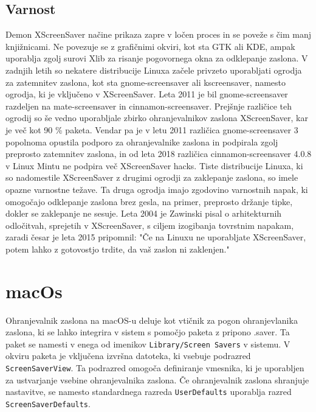 \documentclass[11pt, oneside]{article}   	%
\begin{document}
\subsection{Varnost}
Demon XScreenSaver načine prikaza zapre v ločen proces in se poveže s čim manj knjižnicami. Ne povezuje se z grafičnimi okviri, kot sta GTK ali KDE, ampak uporablja zgolj surovi Xlib za risanje pogovornega okna za odklepanje zaslona.
\newline
V zadnjih letih so nekatere distribucije Linuxa začele privzeto uporabljati ogrodja za zatemnitev zaslona, kot sta gnome-screensaver ali kscreensaver, namesto ogrodja, ki je vključeno v XScreenSaver. Leta 2011 je bil gnome-screensaver razdeljen na mate-screensaver in cinnamon-screensaver. Prejšnje različice teh ogrodij so še vedno uporabljale zbirko ohranjevalnikov zaslona XScreenSaver, kar je več kot 90 \% paketa. Vendar pa je v letu 2011 različica gnome-screensaver 3 popolnoma opustila podporo za ohranjevalnike zaslona in podpirala zgolj preprosto zatemnitev zaslona, in od leta 2018 različica cinnamon-screensaver 4.0.8 v Linux Mintu ne podpira več XScreenSaver hacks.
\newline
Tiste distribucije Linuxa, ki so nadomestile XScreenSaver z drugimi ogrodji za zaklepanje zaslona, so imele opazne varnostne težave. Ta druga ogrodja imajo zgodovino varnostnih napak, ki omogočajo odklepanje zaslona brez gesla, na primer, preprosto držanje tipke, dokler se zaklepanje ne sesuje.
\newline
Leta 2004 je Zawinski pisal o arhitekturnih odločitvah, sprejetih v XScreenSaver, s ciljem izogibanja tovrstnim napakam, zaradi česar je leta 2015 pripomnil: "Če na Linuxu ne uporabljate XScreenSaver, potem lahko z gotovostjo trdite, da vaš zaslon ni zaklenjen."

\section{macOs}
Ohranjevalnik zaslona na macOS-u deluje kot vtičnik za pogon ohranjevlanika zaslona, ki se lahko integrira v sistem s pomočjo paketa z pripono .saver. Ta paket se namesti v enega od imenikov \Verb#Library/Screen Savers# v sistemu. V okviru paketa je vključena izvršna datoteka, ki vsebuje podrazred \Verb#ScreenSaverView#. Ta podrazred omogoča definiranje vmesnika, ki je uporabljen za ustvarjanje vsebine ohranjevalnika zaslona. Če ohranjevalnik zaslona shranjuje nastavitve, se namesto standardnega razreda \Verb#UserDefaults# uporablja razred \Verb#ScreenSaverDefaults#.
\end{document}
